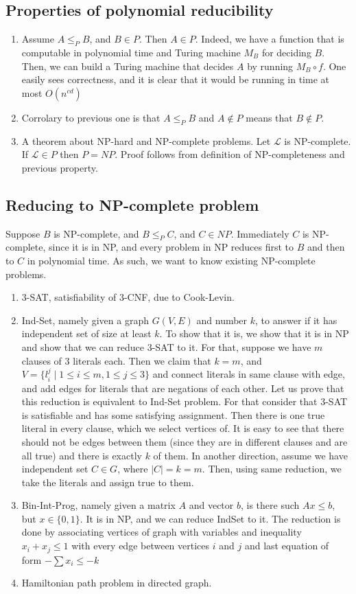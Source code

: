 \documentclass[12pt]{article}
\begin{document}
\subsection{Properties of polynomial reducibility}
\begin{enumerate}
\item Assume \(A\leq_P B\), and \(B\in P\). Then \(A\in P\). Indeed, we have a function that is computable in polynomial time and Turing machine \(M_B\) for deciding \(B\).
  Then, we can build a Turing machine that decides \(A\) by running \(M_B\circ f \). One easily sees correctness, and it is clear that it would be running in time at most \(O(n^{cd})\)
\item Corrolary to previous one is that \(A\leq_P B\) and \(A\notin P\) means that \(B\notin P\).
\item A theorem about NP-hard and NP-complete problems. Let \(\mathcal L\) is NP-complete. If \(\mathcal L\in P\) then \(P=NP\). Proof follows from definition of NP-completeness and previous property.
\end{enumerate}
\subsection{Reducing to NP-complete problem}
Suppose \(B\) is NP-complete, and \(B\leq_P C\), and \(C\in NP\). Immediately \(C\) is NP-complete, since it is in NP, and every problem in NP reduces first to \(B\) and then to \(C\) in polynomial time.
As such, we want to know existing NP-complete problems.
\begin{enumerate}
\item 3-SAT, satisfiability of 3-CNF, due to Cook-Levin.
\item Ind-Set, namely given a graph \(G(V,E)\) and number \(k\), to answer if it has independent set of size at least \(k\).
  To show that it is, we show that it is in NP and show that we can reduce 3-SAT to it. For that, suppose we have \(m\) clauses of 3 literals each.
  Then we claim that \(k=m\), and \(V=\{l^j_i\mid 1\leq i\leq m, 1\leq j\leq 3\}\) and connect literals in same clause with edge,
  and add edges for literals that are negations of each other. Let us prove that this reduction is equivalent to Ind-Set problem.
  For that consider that 3-SAT is satisfiable and has some satisfying assignment. Then there is one true literal in every clause, which we select vertices of.
  It is easy to see that there should not be edges between them (since they are in different clauses and are all true) and there is exactly \(k\) of them.
  In another direction, assume we have independent set \(C\in G\), where \(|C|=k=m\). Then, using same reduction, we take the literals and assign true to them.
\item Bin-Int-Prog, namely given a matrix \(A\) and vector \(b\), is there such \(Ax\leq b\), but \(x\in\{0,1\}\). It is in NP, and we can reduce IndSet to it.
  The reduction is done by associating vertices of graph with variables and inequality \(x_i+x_j\leq 1\) with every edge between vertices \(i\) and \(j\) and last equation of form \(-\sum x_i\leq -k\)
\item Hamiltonian path problem in directed graph.
\end{enumerate}
\end{document}

